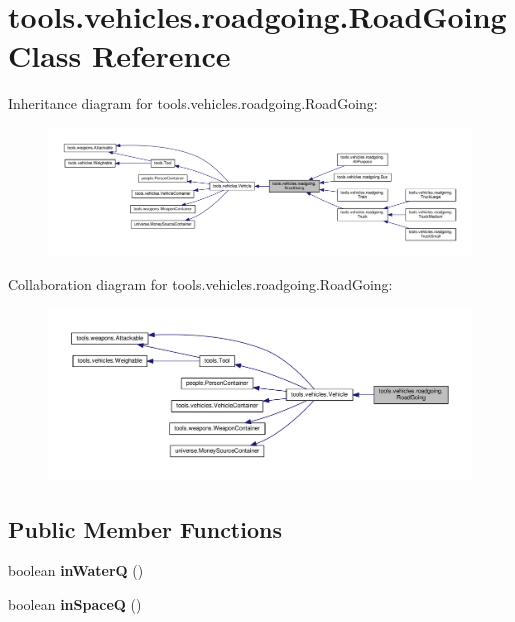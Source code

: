 \hypertarget{classtools_1_1vehicles_1_1roadgoing_1_1_road_going}{}\section{tools.\+vehicles.\+roadgoing.\+Road\+Going Class Reference}
\label{classtools_1_1vehicles_1_1roadgoing_1_1_road_going}


Inheritance diagram for tools.\+vehicles.\+roadgoing.\+Road\+Going\+:
\nopagebreak
\begin{figure}[H]
\begin{center}
\leavevmode
\includegraphics[width=350pt]{classtools_1_1vehicles_1_1roadgoing_1_1_road_going__inherit__graph}
\end{center}
\end{figure}


Collaboration diagram for tools.\+vehicles.\+roadgoing.\+Road\+Going\+:
\nopagebreak
\begin{figure}[H]
\begin{center}
\leavevmode
\includegraphics[width=350pt]{classtools_1_1vehicles_1_1roadgoing_1_1_road_going__coll__graph}
\end{center}
\end{figure}
\subsection*{Public Member Functions}
\begin{DoxyCompactItemize}
\item 
boolean {\bfseries in\+WaterQ} ()\hypertarget{classtools_1_1vehicles_1_1roadgoing_1_1_road_going_a0113fbef812abadfe547b0e625824d78}{}\label{classtools_1_1vehicles_1_1roadgoing_1_1_road_going_a0113fbef812abadfe547b0e625824d78}

\item 
boolean {\bfseries in\+SpaceQ} ()\hypertarget{classtools_1_1vehicles_1_1roadgoing_1_1_road_going_ad7340d6b3b91e565a71b8c3c396f0a75}{}\label{classtools_1_1vehicles_1_1roadgoing_1_1_road_going_ad7340d6b3b91e565a71b8c3c396f0a75}

\end{DoxyCompactItemize}
